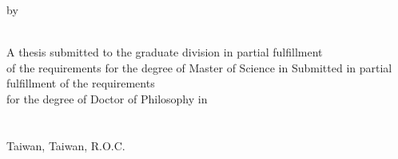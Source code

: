\begin{center}


\begin{minipage}[c][5cm][t]{\textwidth}
  \begin{center}
    \makebox[\textwidth][c]{\parbox{\paperwidth }{\center \Large \GetEngTitle}}

    \vspace{0.5cm}
    \Large by \\

    \vspace{0.5cm}
    \Large \GetAuthorEngName \\
  \end{center}
\end{minipage}


\begin{minipage}[c][5cm][t]{\textwidth}
  \begin{center}\Large %
  {%
    A thesis submitted to the graduate division in partial fulfillment\\
    of the requirements for the degree of Master of Science in%
  } %
  {%
    Submitted in partial fulfillment of the requirements\\%
    for the degree of Doctor of Philosophy in%
  } %
  \GetDeptEngName\\%
  \GetCollEngName\\%
  \GetSchoolEngName\\%
  Taiwan, Taiwan, R.O.C.\\%
  \vspace{0.1cm}
  \GetOralEngDay \thinspace \thinspace \GetThesisMonthInEng \thinspace \thinspace \GetThesisYear%
  \end{center}
\end{minipage}


\vspace{1.0cm}
\begin{minipage}[c][8.0cm][t]{\textwidth}
   \\
  \DisplayCommitteeSignatureArea
\end{minipage}


\end{center}
